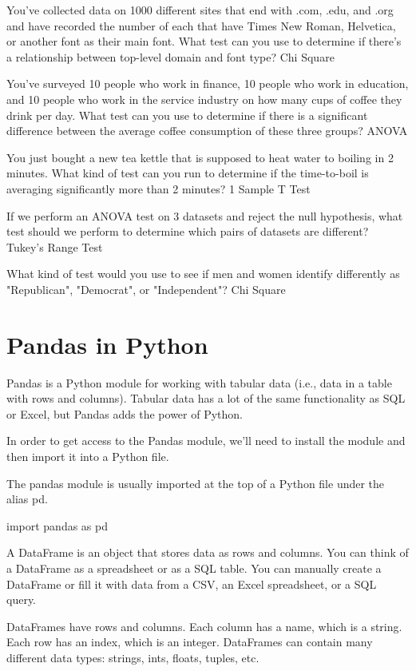 \documentclass{journal}
\begin{document}
You've collected data on 1000 different sites that end with .com, .edu, and .org and have recorded the number of each that have Times New Roman, Helvetica, or another font as their main font. What test can you use to determine if there's a relationship between top-level domain and font type?
Chi Square


You've surveyed 10 people who work in finance, 10 people who work in education, and 10 people who work in the service industry on how many cups of coffee they drink per day. What test can you use to determine if there is a significant difference between the average coffee consumption of these three groups?
ANOVA

You just bought a new tea kettle that is supposed to heat water to boiling in 2 minutes. What kind of test can you run to determine if the time-to-boil is averaging significantly more than 2 minutes?
1 Sample T Test

If we perform an ANOVA test on 3 datasets and reject the null hypothesis, what test should we perform to determine which pairs of datasets are different?
Tukey's Range Test

What kind of test would you use to see if men and women identify differently as "Republican", "Democrat", or "Independent"?
Chi Square

\section{Pandas in Python}
Pandas is a Python module for working with tabular data (i.e., data in a table with rows and columns). Tabular data has a lot of the same functionality as SQL or Excel, but Pandas adds the power of Python.

In order to get access to the Pandas module, we'll need to install the module and then import it into a Python file. 

The pandas module is usually imported at the top of a Python file under the alias pd.

import pandas as pd

A DataFrame is an object that stores data as rows and columns. You can think of a DataFrame as a spreadsheet or as a SQL table. You can manually create a DataFrame or fill it with data from a CSV, an Excel spreadsheet, or a SQL query.

DataFrames have rows and columns. Each column has a name, which is a string. Each row has an index, which is an integer. DataFrames can contain many different data types: strings, ints, floats, tuples, etc.
\end{document}
